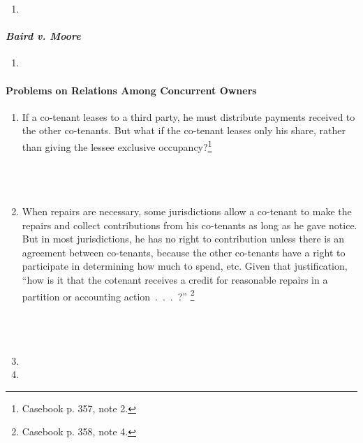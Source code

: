 \begin{enumerate}
    \item %
\end{enumerate}

\paragraph{\emph{Baird v. Moore}}

\begin{enumerate}
    \item %
\end{enumerate}

\paragraph{Problems on Relations Among Concurrent Owners}

\begin{enumerate}
    \item If a co-tenant leases to a third party, he must distribute payments 
    received to the other co-tenants. But what if the co-tenant leases only 
    his share, rather than giving the lessee exclusive 
    occupancy?\footnote{Casebook p. 357, note 2.}
    ~\\\\\\\\ %
    \item When repairs are necessary, some jurisdictions allow a co-tenant to 
    make the repairs and collect contributions from his co-tenants as long as 
    he gave notice. But in most jurisdictions, he has no right to contribution 
    unless there is an agreement between co-tenants, because the other 
    co-tenants have a right to participate in determining how much to spend, 
    etc. Given that justification, ``how is it that the cotenant receives a 
    credit for reasonable repairs in a partition or accounting 
    action~.~.~.~?'' \footnote{Casebook p. 358, note 4.}
    ~\\\\\\\\ %
    \item  %
    \item %
\end{enumerate}





